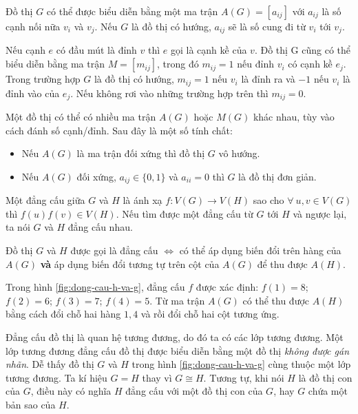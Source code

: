 Đồ thị $G$ có thể được biểu diễn bằng một ma trận $A(G) = [a_{ij}]$ với $a_{ij}$ là số cạnh nối nữa $v_i$ và $v_j$. Nếu $G$ là đồ thị có hướng, $a_{ij}$ sẽ là số cung đi từ $v_i$ tới $v_j$.

Nếu cạnh $e$ có đầu mút là đỉnh $v$ thì $e$ gọi là cạnh kề của $v$. Đồ thị G cũng có thể biểu diễn bằng ma trận $M = [m_{ij}]$, trong đó $m_{ij} = 1$ nếu đỉnh $v_i$ có cạnh kề $e_j$. Trong trường hợp $G$ là đồ thị có hướng, $m_{ij} = 1$ nếu $v_i$ là đỉnh ra  và $-1$ nếu $v_i$ là đỉnh vào của $e_j$. Nếu không rơi vào những trường hợp trên thì $m_{ij} = 0$.




Một đồ thị có thể có nhiều ma trận $A(G)$ hoặc $M(G)$ khác nhau, tùy vào cách đánh số cạnh/đỉnh. Sau đây là một số tính chất:
\begin{itemize}
	\item Nếu $A(G)$ là ma trận đối xứng thì đồ thị $G$ vô hướng. 
	\item Nếu $A(G)$ đối xứng, $a_{ij} \in \{0,1\}$ và $a_{ii} = 0$ thì $G$ là đồ thị đơn giản.
\end{itemize}

\begin{definition}
	Một đẳng cấu giữa $G$ và $H$ là ánh xạ ${f: V(G) \to V(H)}$ sao cho $\forall\ u,v \in V(G)$ thì $f(u)f(v) \in V(H)$. Nếu tìm được một đẳng cấu từ $G$ tới $H$ và ngược lại, ta nói $G$ và $H$ đẳng cấu nhau.
\end{definition}

Đồ thị $G$ và $H$ được gọi là đẳng cấu $\iff$ có thể áp dụng biến đổi trên hàng của $A(G)$ \textbf{và} áp dụng biến đổi tương tự trên cột của $A(G)$ để thu được $A(H)$.



Trong hình \ref{fig:dong-cau-h-va-g}, đẳng cấu $f$ được xác định: $f(1) = 8$; $f(2) = 6$; $f(3) = 7$; $f(4) = 5$. Từ ma trận $A(G)$ có thể thu được $A(H)$ bằng cách đổi chỗ hai hàng $1,4$ và rồi đổi chỗ hai cột tương ứng.

Đẳng cấu đồ thị là quan hệ tương đương, do đó ta có các lớp tương đương. Một lớp tương đương đẳng cấu đồ thị được biểu diễn bằng một đồ thị \textit{không được gán nhãn}. Dễ thấy đồ thị $G$ và $H$ trong hình \ref{fig:dong-cau-h-va-g} cùng thuộc một lớp tương đương. Ta kí hiệu $G = H$ thay vì $G \cong H$. Tương tự, khi nói $H$ là đồ thị con của $G$, điều này có nghĩa $H$ đẳng cấu với một đồ thị con của $G$, hay $G$ chứa một bản sao của $H$. 

